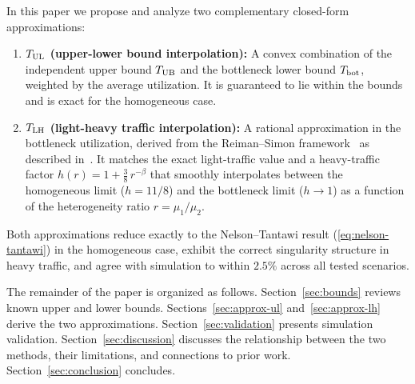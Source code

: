 In this paper we propose and analyze two complementary closed-form
approximations:
\begin{enumerate}
\item \textbf{$T_{\text{UL}}$ (upper-lower bound interpolation):}
      A convex combination of the independent upper bound $T_{\text{UB}}$ and the
      bottleneck lower bound $T_{\text{bot}}$, weighted by the average utilization.
      It is guaranteed to lie within the bounds and is exact for the
      homogeneous case.
\item \textbf{$T_{\text{LH}}$ (light-heavy traffic interpolation):}
      A rational approximation in the bottleneck utilization, derived from the
      Reiman--Simon framework~\citep{Reiman1988} as described
      in~\citep{Squillante2026}.
      It matches the exact light-traffic value and a heavy-traffic factor
      $h(r) = 1 + \tfrac{3}{8}\,r^{-\beta}$ that smoothly interpolates
      between the homogeneous limit ($h = 11/8$) and the bottleneck limit
      ($h \to 1$) as a function of the heterogeneity ratio $r = \mu_1/\mu_2$.
\end{enumerate}

Both approximations reduce exactly to the Nelson--Tantawi result
(\ref{eq:nelson-tantawi}) in the homogeneous case, exhibit the correct
singularity structure in heavy traffic, and agree with simulation to within
$2.5\%$ across all tested scenarios.

The remainder of the paper is organized as follows.
Section~\ref{sec:bounds} reviews known upper and lower bounds.
Sections~\ref{sec:approx-ul} and~\ref{sec:approx-lh} derive the two
approximations.
Section~\ref{sec:validation} presents simulation validation.
Section~\ref{sec:discussion} discusses the relationship between the two
methods, their limitations, and connections to prior work.
Section~\ref{sec:conclusion} concludes.
